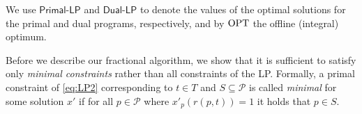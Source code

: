 \documentclass[11pt]{article}
\newcommand{\cP}{{\mathcal{P}}}
\newcommand{\OPT}{\textnormal{OPT}}
\newcommand{\om}{{\Omega}}
\begin{document}
We use $\textsf{Primal-LP}$ and $\textsf{Dual-LP}$ to denote the values of the optimal solutions for the primal and dual programs, respectively, and by $\OPT$ the offline (integral) optimum. 

Before we describe our fractional algorithm, we show that it is sufficient to satisfy only {\em minimal constraints} rather than all constraints of the LP. Formally,
a primal constraint of \eqref{eq:LP2} corresponding to $t \in T$ and $S \subseteq \cP$ is called {\em minimal} for some solution $x'$ if for all $p \in \cP$ where $x'_p(r(p,t)) = 1$ it holds that $p \in S$. %
\end{document}
